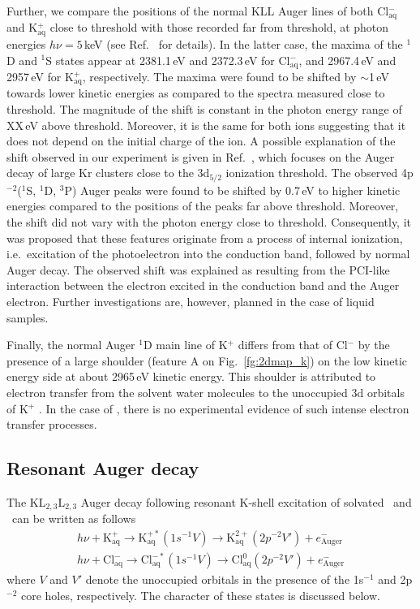 Further, we compare the positions of the normal KLL Auger lines of both Cl$^{-}_{\text{aq}}$ and K$^{+}_{\text{aq}}$ close to threshold with those recorded far from threshold, at photon energies $h\nu = 5$\,keV (see Ref.\ \citep{ceolin17:263003} for details). In the latter case, the maxima of the $^1$D and $^1$S states appear at 2381.1\,eV and 2372.3\,eV for Cl$^{-}_{\text{aq}}$, and 2967.4\,eV and 2957\,eV for K$^{+}_{\text{aq}}$, respectively. The maxima were found to be shifted by $\sim$1\,eV towards lower kinetic energies as compared to the spectra measured close to threshold. The magnitude of the shift is constant in the photon energy range of {\color{red}XX\,eV above threshold.} Moreover, it is the same for both ions suggesting that it does not depend on the initial charge of the ion. A possible explanation of the shift observed in our experiment is given in Ref.\ \cite{tchaplyguine07:124314}, which focuses on the Auger decay of large Kr clusters close to the 3d$_{5/2}$ ionization threshold. The observed 4p$^{-2}$($^1$S, $^1$D, $^3$P) Auger peaks were found to be shifted by 0.7\,eV to higher kinetic energies compared to the positions of the peaks far above threshold. Moreover, the shift did not vary with the photon energy close to threshold. Consequently, it was proposed that these features originate from a process of internal ionization, i.e.\ excitation of the photoelectron into the conduction band, followed by normal Auger decay. The observed shift was explained as resulting from the PCI-like interaction between the electron excited in the conduction band and the Auger electron. Further investigations are, however, planned in the case of liquid samples.


Finally, the normal Auger $^1$D main line of K$^{+}$ differs from that of Cl$^{-}$ by the presence of a large shoulder (feature A on Fig.\ \ref{fg:2dmap_k}) on the low kinetic energy side at about 2965\,eV kinetic energy. This shoulder is attributed to electron transfer from the solvent water molecules to the unoccupied 3d orbitals of K$^{+}$ \citep{ceolin17:263003}. In the case of \cli, there is no experimental evidence of such intense electron transfer processes.


\subsection{Resonant Auger decay} \label{ssec:ra}


The KL$_{2,3}$L$_{2,3}$ Auger decay following resonant K-shell excitation of solvated \ki~and \cli~can be written as follows
%
\begin{align*}
h\nu + \text{K}^{+}_{\text{aq}} \rightarrow \text{K}^{+*}_{\text{aq}} (1s^{-1}V) \rightarrow \text{K}^{2+}_{\text{aq}} (2p^{-2}V') + e^{-}_{\text{Auger}}\\
%
h\nu + \text{Cl}^{-}_{\text{aq}} \rightarrow \text{Cl}^{-*}_{\text{aq}} (1s^{-1}V) \rightarrow \text{Cl}^{0}_{\text{aq}}(2p^{-2}V') + e^{-}_{\text{Auger}}
\end{align*}
%
where $V$ and $V'$ denote the unoccupied orbitals in the presence of the 1s$^{-1}$ and 2p$^{-2}$ core holes, respectively. The character of these states is discussed below.

